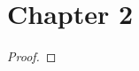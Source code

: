 %
\chapter{Chapter 2}
\begin{theorem}
    \label{thm:add_zero}
    \leanok
\end{theorem}
\begin{proof}
    \leanok
\end{proof}